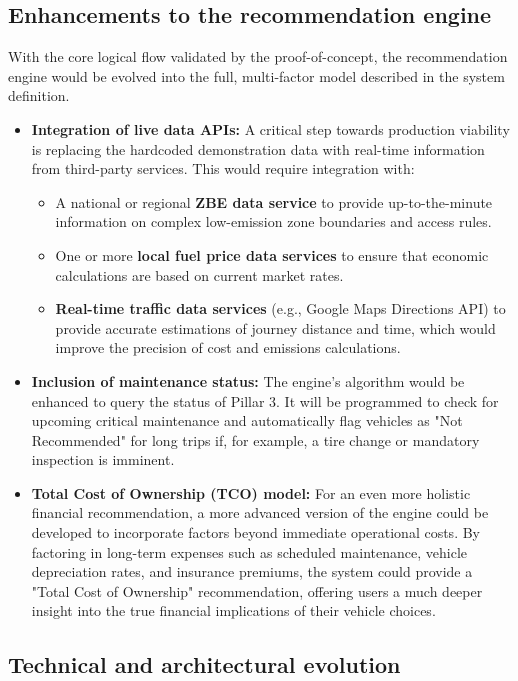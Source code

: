 \subsection{Enhancements to the recommendation engine}

With the core logical flow validated by the proof-of-concept, the recommendation engine would be evolved into the full, multi-factor model described in the system definition.

\begin{itemize}
\item \textbf{Integration of live data APIs:} A critical step towards production viability is replacing the hardcoded demonstration data with real-time information from third-party services. This would require integration with:
\begin{itemize}
\item A national or regional \textbf{ZBE data service} to provide up-to-the-minute information on complex low-emission zone boundaries and access rules.
\item One or more \textbf{local fuel price data services} to ensure that economic calculations are based on current market rates.
\item \textbf{Real-time traffic data services} (e.g., Google Maps Directions API) to provide accurate estimations of journey distance and time, which would improve the precision of cost and emissions calculations.
\end{itemize}
\textgap
\item \textbf{Inclusion of maintenance status:} The engine's algorithm would be enhanced to query the status of Pillar 3. It will be programmed to check for upcoming critical maintenance and automatically flag vehicles as "Not Recommended" for long trips if, for example, a tire change or mandatory inspection is imminent.
\textgap
\item \textbf{Total Cost of Ownership (TCO) model:} For an even more holistic financial recommendation, a more advanced version of the engine could be developed to incorporate factors beyond immediate operational costs. By factoring in long-term expenses such as scheduled maintenance, vehicle depreciation rates, and insurance premiums, the system could provide a "Total Cost of Ownership" recommendation, offering users a much deeper insight into the true financial implications of their vehicle choices.
\end{itemize}

\subsection{Technical and architectural evolution}

